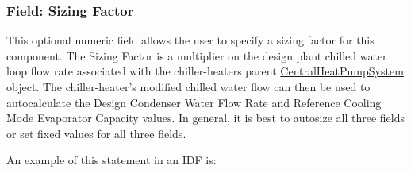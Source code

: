 \subsubsection{Field: Sizing Factor}\label{field-sizing-factor-12}

This optional numeric field allows the user to specify a sizing factor for this component. The Sizing Factor is a multiplier on the design plant chilled water loop flow rate associated with the chiller-heaters parent \hyperref[centralheatpumpsystem]{CentralHeatPumpSystem} object. The chiller-heater's modified chilled water flow can then be used to autocalculate the Design Condenser Water Flow Rate and Reference Cooling Mode Evaporator Capacity values. In general, it is best to autosize all three fields or set fixed values for all three fields.

An example of this statement in an IDF is:

